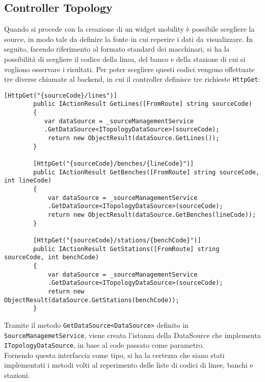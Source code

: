 \subsection{Controller Topology}
Quando si procede con la creazione di un widget mobility è possibile scegliere la source, in modo tale da definire la fonte in cui reperire i dati da visualizzare. In seguito,  facendo riferimento al formato standard dei macchinari, si ha la possibilità di scegliere il codice della linea, del banco e della stazione di cui si vogliono osservare i risultati.
Per poter scegliere questi codici vengono effettuate tre diverse chiamate al backend, in cui il controller definisce tre richieste \verb|HttpGet|: \\
\begin{lstlisting}[caption={TopologyController.cs}, style=javaScriptCode, label={lst:cacheattribute}]
        [HttpGet("{sourceCode}/lines")]
        public IActionResult GetLines([FromRoute] string sourceCode)
        {
           var dataSource = _sourceManagementService
           .GetDataSource<ITopologyDataSource>(sourceCode);
            return new ObjectResult(dataSource.GetLines());
        }

        [HttpGet("{sourceCode}/benches/{lineCode}")]
        public IActionResult GetBenches([FromRoute] string sourceCode, int lineCode)
        {
            var dataSource = _sourceManagementService
            .GetDataSource<ITopologyDataSource>(sourceCode);
            return new ObjectResult(dataSource.GetBenches(lineCode));
        }

        [HttpGet("{sourceCode}/stations/{benchCode}")]
        public IActionResult GetStations([FromRoute] string sourceCode, int benchCode)
        {
            var dataSource = _sourceManagementService
            .GetDataSource<ITopologyDataSource>(sourceCode);
            return new ObjectResult(dataSource.GetStations(benchCode));
        }
\end{lstlisting}
Tramite il metodo \verb|GetDataSource<DataSource>| definito in \verb|SourceManagemetService|, viene creata l'istanza della DataSource che implementa \verb|ITopologyDataSource|, in base al code passato come parametro.\\
Fornendo questa interfaccia come tipo, si ha la certezza che siano stati implementati i metodi volti al reperimento delle liste di codici di linee, banchi e stazioni.
